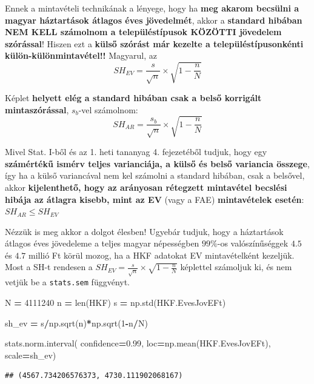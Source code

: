 \documentclass[
]{book}
\newenvironment{Shaded}{\begin{snugshade}}{\end{snugshade}}
\newcommand{\BuiltInTok}[1]{#1}
\newcommand{\DecValTok}[1]{\textcolor[rgb]{0.00,0.00,0.81}{#1}}
\newcommand{\FloatTok}[1]{\textcolor[rgb]{0.00,0.00,0.81}{#1}}
\newcommand{\NormalTok}[1]{#1}
\newcommand{\OperatorTok}[1]{\textcolor[rgb]{0.81,0.36,0.00}{\textbf{#1}}}
\begin{document}
Ennek a mintavételi technikának a lényege, hogy ha \textbf{meg akarom becsülni a magyar háztartások átlagos éves jövedelmét}, akkor a \textbf{standard hibában NEM KELL számolnom a településtípusok KÖZÖTTI jövedelem szórással}! Hiszen ezt a \textbf{külső szórást már kezelte a településtípusonkénti külön-különmintavétel!!}
Magyarul, az \[SH_{EV} = \frac{s}{\sqrt{n}} \times \sqrt{1-\frac{n}{N}}\]

Képlet \textbf{helyett elég a standard hibában csak a belső korrigált mintaszórással}, \(s_b\)-vel számolnom: \[SH_{AR} = \frac{s_b}{\sqrt{n}} \times \sqrt{1-\frac{n}{N}}\]

Mivel Stat. I-ből és az 1. heti tananyag 4. fejezetéből tudjuk, hogy egy \textbf{számértékű ismérv teljes varianciája, a külső és belső variancia összege}, így ha a külső variancával nem kel számolni a standard hibában, csak a belsővel, akkor \textbf{kijelenthető, hogy az arányosan rétegzett mintavétel becslési hibája az átlagra kisebb, mint az EV} (vagy a FAE) \textbf{mintavételek esetén}: \(SH_{AR} \leq SH_{EV}\)

Nézzük is meg akkor a dolgot élesben! Ugyebár tudjuk, hogy a háztartások átlagos éves jövedeleme a teljes magyar népességben \(99\%\)-os valószínűséggek \(4.5\) és \(4.7\) millió Ft körül mozog, ha a HKF adatokat EV mintavételként kezeljük. Most a SH-t rendesen a \(SH_{EV}=\frac{s}{\sqrt{n}} \times \sqrt{1-\frac{n}{N}}\) képlettel számoljuk ki, és nem vetjük be a \texttt{stats.sem} függvényt.

\begin{Shaded}
\begin{Highlighting}[]
\NormalTok{N }\OperatorTok{=} \DecValTok{4111240}
\NormalTok{n }\OperatorTok{=} \BuiltInTok{len}\NormalTok{(HKF)}
\NormalTok{s }\OperatorTok{=}\NormalTok{ np.std(HKF.EvesJovEFt)}

\NormalTok{sh\_ev }\OperatorTok{=}\NormalTok{ s}\OperatorTok{/}\NormalTok{np.sqrt(n)}\OperatorTok{*}\NormalTok{np.sqrt(}\DecValTok{1}\OperatorTok{{-}}\NormalTok{n}\OperatorTok{/}\NormalTok{N)}

\NormalTok{stats.norm.interval(}
\NormalTok{  confidence}\OperatorTok{=}\FloatTok{0.99}\NormalTok{,}
\NormalTok{  loc}\OperatorTok{=}\NormalTok{np.mean(HKF.EvesJovEFt),}
\NormalTok{  scale}\OperatorTok{=}\NormalTok{sh\_ev)}
\end{Highlighting}
\end{Shaded}

\begin{verbatim}
## (4567.734206576373, 4730.111902068167)
\end{verbatim}
\end{document}
